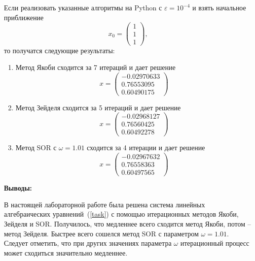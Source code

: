 Если реализовать указанные алгоритмы на Python с $\varepsilon = 10^{-4}$ и взять начальное приближение
\begin{equation}
    x_0 = \begin{pmatrix}
    1 \\
    1 \\
    1
    \end{pmatrix},
\end{equation}
то получатся следующие результаты:
\begin{enumerate}
    \item Метод Якоби сходится за 7 итераций и дает решение
    \begin{equation}
        x = \begin{pmatrix}
        -0.02970633 \\
        0.76553095 \\
        0.60490175
        \end{pmatrix}
    \end{equation}
    \item Метод Зейделя сходится за 5 итераций и дает решение
    \begin{equation}
        x = \begin{pmatrix}
        -0.02968127 \\
        0.76560425 \\
        0.60492278
        \end{pmatrix}
    \end{equation}
    \item Метод SOR с $\omega = 1.01$ сходится за 4 итерации и дает решение
    \begin{equation}
        x = \begin{pmatrix}
        -0.02967632 \\
        0.76558363 \\
        0.60497565
        \end{pmatrix}
    \end{equation}
\end{enumerate}

\textbf{Выводы:}

В настоящей лабораторной работе была решена система линейных алгебраических уравнений~(\ref{task}) с помощью итерационных методов Якоби, Зейделя и SOR. Получилось, что медленнее всего сходится метод Якоби, потом -- метод Зейделя. Быстрее всего сошелся метод SOR с параметром $\omega = 1.01$. Следует отметить, что при других значениях параметра $\omega$ итерационный процесс может сходиться значительно медленнее.